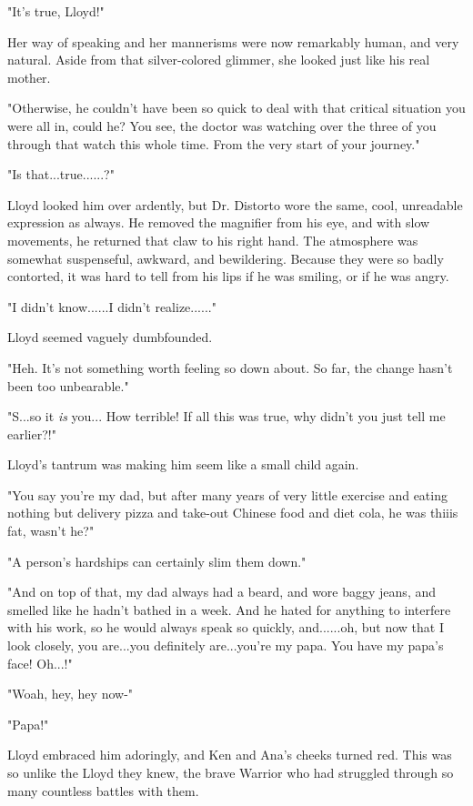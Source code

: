 \documentclass[
]{article}
\begin{document}
"It's true, Lloyd!"

Her way of speaking and her mannerisms were now remarkably human, and
very natural. Aside from that silver-colored glimmer, she looked just
like his real mother.

"Otherwise, he couldn't have been so quick to deal with that critical
situation you were all in, could he? You see, the doctor was watching
over the three of you through that watch this whole time. From the very
start of your journey."

"Is that...true......?"

Lloyd looked him over ardently, but Dr. Distorto wore the same, cool,
unreadable expression as always. He removed the magnifier from his eye,
and with slow movements, he returned that claw to his right hand. The
atmosphere was somewhat suspenseful, awkward, and bewildering. Because
they were so badly contorted, it was hard to tell from his lips if he
was smiling, or if he was angry.

"I didn't know......I didn't realize......"

Lloyd seemed vaguely dumbfounded.

"Heh. It's not something worth feeling so down about. So far, the change
hasn't been too unbearable."

"S...so it \emph{is} you... How terrible! If all this was true, why
didn't you just tell me earlier?!"

Lloyd's tantrum was making him seem like a small child again.

"You say you're my dad, but after many years of very little exercise and
eating nothing but delivery pizza and take-out Chinese food and diet
cola, he was thiiis fat, wasn't he?"

"A person's hardships can certainly slim them down."

"And on top of that, my dad always had a beard, and wore baggy jeans,
and smelled like he hadn't bathed in a week. And he hated for anything
to interfere with his work, so he would always speak so quickly,
and......oh, but now that I look closely, you are...you definitely
are...you're my papa. You have my papa's face! Oh...!"

"Woah, hey, hey now-"

"Papa!"

Lloyd embraced him adoringly, and Ken and Ana's cheeks turned red. This
was so unlike the Lloyd they knew, the brave Warrior who had struggled
through so many countless battles with them.
\end{document}
